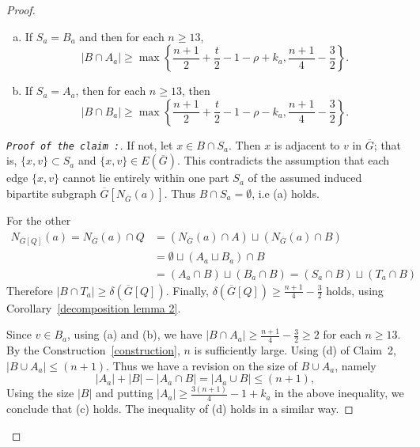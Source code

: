 \documentclass[reqno,10pt]{amsart}
\theoremstyle{definition}
\begin{document}
\begin{proof}
\begin{enumerate}[(a)]
\item If $S_{a}= B_{a}$ and then for each $n\geq13$,  
\begin{equation*}
|B\cap A_{a} |\geq \max \left\{\frac{n+1}{2}+\frac{t}{2}-1-\rho+k_{a}, \frac{n+1}{4}-\frac{3}{2}\right\}.
\end{equation*}

\item If $S_{a}= A_{a}$, then for each $n\geq13$,  then 
\begin{equation*}
|B\cap B_{a} |\geq \max \left\{\frac{n+1}{2}+\frac{t}{2}-1-\rho-k_{a}, \frac{n+1}{4}-\frac{3}{2}\right\}.
\end{equation*}
\end{enumerate}
\begin{proof}[\tt{Proof of the claim} :]\renewcommand{\qedsymbol}{}
If not, let $x\in B\cap S_{a}$. Then $x$ is adjacent to $v$ in $\overline{G}$; that is,  
$\{x,v\}\subset S_{a}$ and $\{x,v\}\in E(\overline{G})$.  This contradicts the assumption that each edge $\{x,v\}$ cannot lie entirely within one part $S_{a}$ of the assumed induced bipartite subgraph $\overline{G}[N_{\overline{G}}(a)]$.  Thus $B\cap S_{a}=\emptyset$, i.e (a) holds.
	
For the other
\begin{align*}
N_{\overline{G}[Q]}(a)=N_{\overline{G}}(a)\cap Q&=(N_{\overline{G}}(a)\cap A)\sqcup (N_{\overline{G}}(a)\cap B)\\
	    &=\emptyset\sqcup (A_{a}\sqcup B_{a})\cap B\\
		&=(A_{a}\cap B)\sqcup (B_{a}\cap B)=(S_{a}\cap B)\sqcup (T_{a}\cap B)
\end{align*}
Therefore $|B\cap T_{a}|\geq\delta(\overline{G}[Q])$. Finally, $\delta(\overline{G}[Q])\geq\frac{n+1}{4}-\frac{3}{2}$ holds, using Corollary~\ref{decomposition lemma 2}.
	
Since $v\in B_{a}$, using (a) and (b), we have  $|B\cap A_{a}|\geq\frac{n+1}{4}-\frac{3}{2}\geq2$ for each $n\geq13$. By the Construction~\ref{construction}, $n$ is sufficiently large. Using (d) of Claim~2, $|B\cup A_{a}|\leq (n+1)$. Thus we have a revision on the size of $B\cup A_{a}$, namely
\begin{equation*}
|A_{a}|+|B|-|A_{a}\cap B|=|A_{a}\cup B|\leq(n+1),   
\end{equation*}
Using the size $|B|$ and putting $|A_{a}|\geq  \frac{3(n+1)}{4}-1+k_{a}$ in the above inequality, we conclude that (c) holds. The inequality of (d) holds in a similar way.
\end{proof}


\end{proof}
\end{document}
